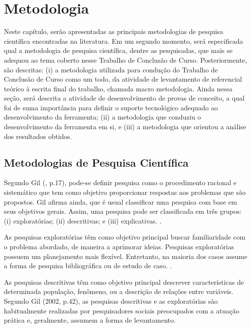 \newpage
\FloatBarrier
\chapter[METODOLOGIA]{Metodologia}

Neste capítulo, serão apresentadas as principais metodologias de pesquisa científica encontradas na literatura. Em um segundo momento, será especificada qual a metodologia de pesquisa científica, dentre as pesquisadas, que mais se adequou ao tema coberto nesse Trabalho de Conclusão de Curso. Posteriormente, são descritas: (i) a metodologia utilizada para condução do Trabalho de Conclusão de Curso como um todo, da atividade de levantamento de referencial teórico à escrita final do trabalho, chamada macro metodologia. Ainda nessa seção, será descrita a atividade de desenvolvimento de provas de conceito, a qual foi de suma importância para definir o suporte tecnológico adequado ao desenvolvimento da ferramenta; (ii) a metodologia que conduziu o desenvolvimento da ferramenta em si, e (iii) a metodologia que orientou a análise dos resultados obtidos.

\section{Metodologias de Pesquisa Científica}

Segundo Gil (\citeyear{gil2002}, p.17), pode-se definir pesquisa como o procedimento racional e sistemático que tem como objetivo proporcionar respostas aos problemas que são propostos. Gil afirma ainda, que é usual classificar uma pesquisa com base em seus objetivos gerais. Assim, uma pesquisa pode ser classificada em três grupos: (i) exploratórias; (ii) descritivas; e (iii) explicativas. \cite[p. 41]{gil2002}.

As pesquisas exploratórias têm como objetivo principal buscar familiaridade com o problema abordado, de maneira a aprimorar ideias.  Pesquisas exploratórias possuem um planejamento mais flexível. Entretanto, na maioria dos casos assume a forma de pesquisa bibliográfica ou de estudo de caso. \cite[p. 41]{gil2002}.

As pesquisas descritivas têm como objetivo principal descrever características de determinada população, fenômeno, ou a descrição de relações entre variáveis. Segundo Gil (2002, p.42), as pesquisas descritivas e as exploratórias são habitualmente realizadas por pesquisadores sociais preocupados com a atuação prática e, geralmente, assumem a forma de levantamento.

